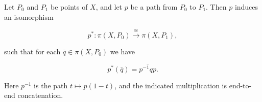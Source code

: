 Let $P_0$ and $P_1$ be points of $X$, and let $p$ be a path from $P_0$ to $P_1$. Then $p$ induces an isomorphism

$$p^*: \pi(X, P_0) \xrightarrow{\cong} \pi(X, P_1),$$

such that for each $\bar{q} \in \pi(X, P_0)$ we have

$$p^*(\bar{q}) = \overline{p^{-1}qp}.$$

Here $p^{-1}$ is the path $t \mapsto p(1-t)$, and the indicated multiplication is end-to-end concatenation.

